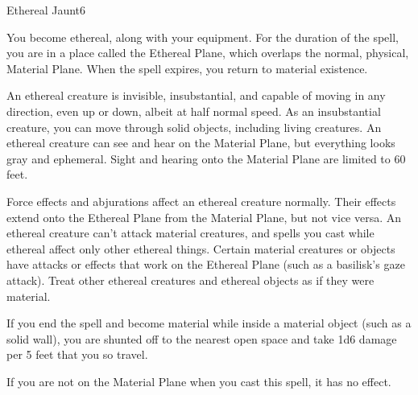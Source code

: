\begin{spellsection}{Ethereal Jaunt}{6}
    \begin{spellheader}
    \end{spellheader}
    \begin{spellcontent}
        \begin{spelltargetinginfo}
        \end{spelltargetinginfo}
        \begin{spelleffects}
            \spelleffect You become ethereal, along with your equipment. For the duration of the spell, you are in a place called the Ethereal Plane, which overlaps the normal, physical, Material Plane. When the spell expires, you return to material existence.
            \par An ethereal creature is invisible, insubstantial, and capable of moving in any direction, even up or down, albeit at half normal speed. As an insubstantial creature, you can move through solid objects, including living creatures. An ethereal creature can see and hear on the Material Plane, but everything looks gray and ephemeral. Sight and hearing onto the Material Plane are limited to 60 feet.
            \par Force effects and abjurations affect an ethereal creature normally. Their effects extend onto the Ethereal Plane from the Material Plane, but not vice versa. An ethereal creature can't attack material creatures, and spells you cast while ethereal affect only other ethereal things. Certain material creatures or objects have attacks or effects that work on the Ethereal Plane (such as a basilisk's gaze attack). Treat other ethereal creatures and ethereal objects as if they were material. 
            \par If you end the spell and become material while inside a material object (such as a solid wall), you are shunted off to the nearest open space and take 1d6 damage per 5 feet that you so travel.
            \spelldur \durshort \dismissable
        \end{spelleffects}
    \end{spellcontent}
    \begin{spellfooter}
        \spellnotes If you are not on the Material Plane when you cast this spell, it has no effect.
        \miscastexplode
    \end{spellfooter}
\end{spellsection}

